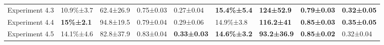\begin{table*}[]
{\begin{tabular}{|l|llll|llll|}
Experiment 4.3 & 10.9\%±3.7        & 62.4±26.9         & 0.75±0.03                 & 0.27±0.04          & \textbf{15.4\%±5.4}        & \textbf{124±52.9}          & \textbf{0.79±0.03} & \textbf{0.32±0.05}        \\
Experiment 4.4 & \textbf{15\%±2.1} & 94.8±19.5         & 0.79±0.04                 & 0.29±0.06          & 14.9\%±3.8                 & \textbf{116.2±41}          & \textbf{0.85±0.03} & \textbf{0.35±0.05}        \\
Experiment 4.5 & 14.1\%±4.6        & 82.8±37.9         & 0.83±0.04                 & \textbf{0.33±0.03} & \textbf{14.6\%±3.2}        & \textbf{93.2±36.9}         & \textbf{0.85±0.02} & 0.32±0.04                 \\ \hline
\end{tabular}%
}
\end{table*}